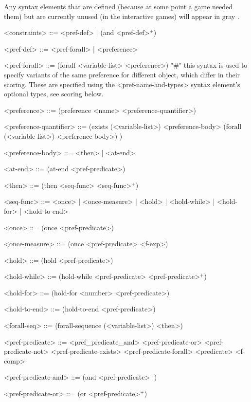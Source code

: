 \documentclass{article}
\begin{document}
        Any syntax elements that are defined (because at some point a game needed them) but are currently unused (in the interactive games) will appear in { \color{gray} gray }.
        
\begin{grammar}
<constraints> ::= <pref-def> | (and <pref-def>$^+$)
    
<pref-def> ::= <pref-forall> | <preference> 

<pref-forall> ::= (forall <variable-list> <preference>) "#" this syntax is used to specify variants of the same preference for different object, which differ in their scoring. These are specified using the <pref-name-and-types> syntax element's optional types, see scoring below.
    
<preference> ::= (preference <name> <preference-quantifier>)

<preference-quantifier> ::= (exists (<variable-list>) <preference-body> 
\alt  (forall (<variable-list>) <preference-body>)
) 

<preference-body> ::=  <then> | <at-end> 

<at-end> ::= (at-end <pref-predicate>)

<then> ::= (then <seq-func> <seq-func>$^+$) 

<seq-func> ::= <once> | <once-measure> | <hold> | <hold-while> | <hold-for> | <hold-to-end>

<once> ::= (once <pref-predicate>)

{ \color{gray} <once-measure> ::= (once <pref-predicate> <f-exp>) }

<hold> ::= (hold <pref-predicate>)

<hold-while> ::= (hold-while <pref-predicate> <pref-predicate>$^+$)

{ \color{gray} <hold-for> ::= (hold-for <number> <pref-predicate>) }

{ \color{gray} <hold-to-end> ::= (hold-to-end <pref-predicate>) }

{ \color{gray} <forall-seq> ::= (forall-sequence (<variable-list>) <then>) }

<pref-predicate> ::= <pref_predicate_and> \alt
    <pref-predicate-or> \alt
    <pref-predicate-not> \alt
    <pref-predicate-exists> \alt
    <pref-predicate-forall> \alt
    <predicate>
    <f-comp>

<pref-predicate-and> ::= (and <pref-predicate>$^+$)

<pref-predicate-or> ::= (or <pref-predicate>$^+$)


\end{grammar}
\end{document}
